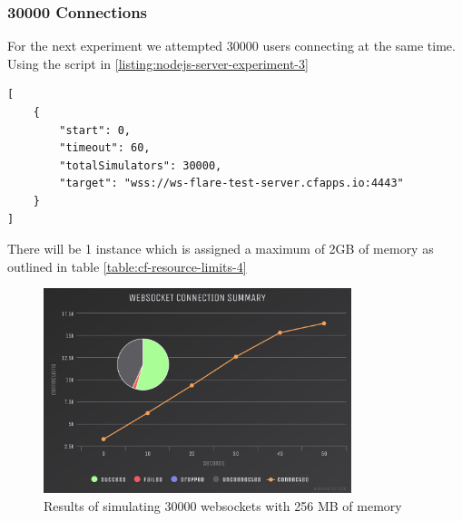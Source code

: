 \subsubsection{30000 Connections}

For the next experiment we attempted 30000 users connecting at the same time. Using the script in \ref{listing:nodejs-server-experiment-3}

\begin{listing}[H]
    \caption{WS-Flare test script for 5000 users}
    \label{listing:nodejs-server-experiment-3}
    \begin{verbatim}
[
    {
        "start": 0,
        "timeout": 60,
        "totalSimulators": 30000,
        "target": "wss://ws-flare-test-server.cfapps.io:4443"
    }
]
\end{verbatim}
\end{listing}

There will be 1 instance which is assigned a maximum of 2GB of memory as outlined in table \ref{table:cf-resource-limits-4}

\begin{table}[H]
\caption{Cloud Foundry Resource Limits}
\label{table:cf-resource-limits-4}
\end{table}

\begin{figure}[H]
  \centering
    \includegraphics[width=0.8\textwidth]{figures/experiments/experiment-1/node-js/conn-summary-30000-256-memory.png}
    \caption{Results of simulating 30000 websockets with 256 MB of memory}
    \label{fig:experiment-3-conn-summary-5000-1-instances-256-mem}
\end{figure}

